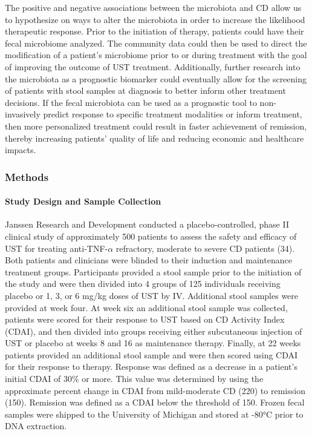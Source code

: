 \documentclass[11pt,]{article}
\let\oldparagraph\paragraph
\renewcommand{\paragraph}[1]{\oldparagraph{#1}\mbox{}}
\begin{document}
The positive and negative associations between the microbiota and CD
allow us to hypothesize on ways to alter the microbiota in order to
increase the likelihood therapeutic response. Prior to the initiation of
therapy, patients could have their fecal microbiome analyzed. The
community data could then be used to direct the modification of a
patient's microbiome prior to or during treatment with the goal of
improving the outcome of UST treatment. Additionally, further research
into the microbiota as a prognostic biomarker could eventually allow for
the screening of patients with stool samples at diagnosis to better
inform other treatment decisions. If the fecal microbiota can be used as
a prognostic tool to non-invasively predict response to specific
treatment modalities or inform treatment, then more personalized
treatment could result in faster achievement of remission, thereby
increasing patients' quality of life and reducing economic and
healthcare impacts.

\newpage

\subsubsection{Methods}\label{methods}

\paragraph{Study Design and Sample
Collection}\label{study-design-and-sample-collection}

Janssen Research and Development conducted a placebo-controlled, phase
II clinical study of approximately 500 patients to assess the safety and
efficacy of UST for treating anti-TNF-\({\alpha}\) refractory, moderate
to severe CD patients (34). Both patients and clinicians were blinded to
their induction and maintenance treatment groups. Participants provided
a stool sample prior to the initiation of the study and were then
divided into 4 groups of 125 individuals receiving placebo or 1, 3, or 6
mg/kg doses of UST by IV. Additional stool samples were provided at week
four. At week six an additional stool sample was collected, patients
were scored for their response to UST based on CD Activity Index (CDAI),
and then divided into groups receiving either subcutaneous injection of
UST or placebo at weeks 8 and 16 as maintenance therapy. Finally, at 22
weeks patients provided an additional stool sample and were then scored
using CDAI for their response to therapy. Response was defined as a
decrease in a patient's initial CDAI of 30\% or more. This value was
determined by using the approximate percent change in CDAI from
mild-moderate CD (220) to remission (150). Remission was defined as a
CDAI below the threshold of 150. Frozen fecal samples were shipped to
the University of Michigan and stored at -80°C prior to DNA extraction.
\end{document}
